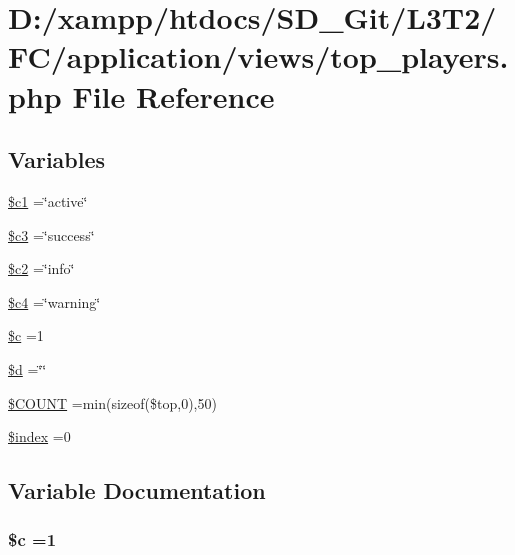 \hypertarget{top__players_8php}{}\section{D\+:/xampp/htdocs/\+S\+D\+\_\+\+Git/\+L3\+T2/\+F\+C/application/views/top\+\_\+players.php File Reference}
\label{top__players_8php}
\subsection*{Variables}
\begin{DoxyCompactItemize}
\item 
\hyperlink{top__players_8php_a751ee5fcf0f1391e93992319585f6e83}{\$c1} =\char`\"{}active\char`\"{}
\item 
\hyperlink{top__players_8php_a78a28e488f33dbd56e562b07dc3862e3}{\$c3} =\char`\"{}success\char`\"{}
\item 
\hyperlink{top__players_8php_a7d0ce9eb4b126a1a12c7dade4f7ab7ef}{\$c2} =\char`\"{}info\char`\"{}
\item 
\hyperlink{top__players_8php_a480a6698b6eb8bfee885295be554a1e7}{\$c4} =\char`\"{}warning\char`\"{}
\item 
\hyperlink{top__players_8php_ab73d7f4f2dae233dd561e7fdaab3a77b}{\$c} =1
\item 
\hyperlink{top__players_8php_a0cf5dd496d9f5ff1edf00d234771dcfe}{\$d} =\char`\"{}\char`\"{}
\item 
\hyperlink{top__players_8php_a2c72ce2b8a6bae42166f51c759f34d31}{\$\+C\+O\+U\+N\+T} =min(sizeof(\$top,0),50)
\item 
\hyperlink{top__players_8php_a23e53dfd2b001b81c9946fa05ec90e6f}{\$index} =0
\end{DoxyCompactItemize}


\subsection{Variable Documentation}
\hypertarget{top__players_8php_ab73d7f4f2dae233dd561e7fdaab3a77b}{}
\subsubsection[{\$c}]{\setlength{\rightskip}{0pt plus 5cm}\${\bf c} =1}\label{top__players_8php_ab73d7f4f2dae233dd561e7fdaab3a77b}
\hypertarget{top__players_8php_a751ee5fcf0f1391e93992319585f6e83}{}
